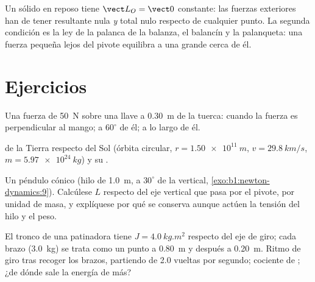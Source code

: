 \begin{remark}[Estática]\label{rem:b1:angular-momentum:statics}
Un sólido en reposo tiene $\vect L_O = \vect 0$ constante: las fuerzas
exteriores han de tener resultante nula \emph{y}  total nulo
respecto de cualquier punto. La segunda condición es la ley de la palanca
de la balanza, el balancín y la palanqueta: una fuerza pequeña lejos del
pivote equilibra a una grande cerca de él.
\end{remark}

\section{Ejercicios}

\begin{exercise}[$\star$]\label{exo:b1:angular-momentum:1}
Una fuerza de \qty{50}{N} sobre una llave a \qty{0.30}{m} de la tuerca:
 cuando la fuerza es perpendicular al mango; a $60^\circ$ de él; a
lo largo de él.
\end{exercise}

\begin{exercise}[$\star$]\label{exo:b1:angular-momentum:2}
 de la Tierra respecto del Sol (órbita circular,
$r = \qty{1.50e11}{m}$, $v = \qty{29.8}{km/s}$, $m = \qty{5.97e24}{kg}$) y
su .
\end{exercise}

\begin{exercise}[$\star$]\label{exo:b1:angular-momentum:3}
Un péndulo cónico (hilo de \qty{1.0}{m}, a $30^\circ$ de la vertical,
\cref{exo:b1:newton-dynamics:9}). Calcúlese $L$ respecto del eje vertical
que pasa por el pivote, por unidad de masa, y explíquese por qué se
conserva aunque actúen la tensión del hilo y el peso.
\end{exercise}

\begin{exercise}[$\star$]\label{exo:b1:angular-momentum:4}
El tronco de una patinadora tiene $J = \qty{4.0}{kg.m^2}$ respecto del eje
de giro; cada brazo (\qty{3.0}{kg}) se trata como un punto a \qty{0.80}{m}
y después a \qty{0.20}{m}. Ritmo de giro tras recoger los brazos,
partiendo de \qty{2.0}{} vueltas por segundo; cociente de ; ¿de dónde sale la energía de más?
\end{exercise}

